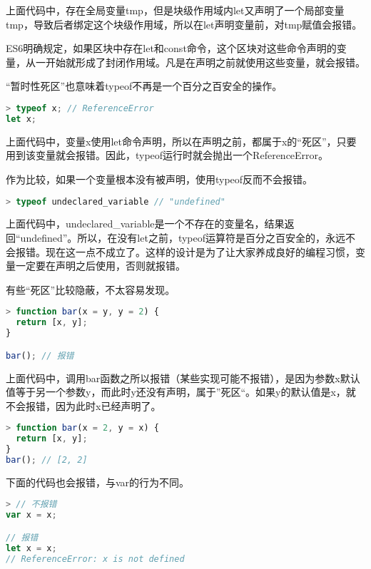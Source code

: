 上面代码中，存在全局变量tmp，但是块级作用域内let又声明了一个局部变量tmp，导致后者绑定这个块级作用域，所以在let声明变量前，对tmp赋值会报错。

ES6明确规定，如果区块中存在let和const命令，这个区块对这些命令声明的变量，从一开始就形成了封闭作用域。凡是在声明之前就使用这些变量，就会报错。

“暂时性死区”也意味着typeof不再是一个百分之百安全的操作。

\begin{lstlisting}[language=JavaScript]
> typeof x; // ReferenceError
let x;
\end{lstlisting}


上面代码中，变量x使用let命令声明，所以在声明之前，都属于x的“死区”，只要用到该变量就会报错。因此，typeof运行时就会抛出一个ReferenceError。

作为比较，如果一个变量根本没有被声明，使用typeof反而不会报错。

\begin{lstlisting}[language=JavaScript]
> typeof undeclared_variable // "undefined"
\end{lstlisting}

上面代码中，undeclared_variable是一个不存在的变量名，结果返回“undefined”。所以，在没有let之前，typeof运算符是百分之百安全的，永远不会报错。现在这一点不成立了。这样的设计是为了让大家养成良好的编程习惯，变量一定要在声明之后使用，否则就报错。

有些“死区”比较隐蔽，不太容易发现。

\begin{lstlisting}[language=JavaScript]
> function bar(x = y, y = 2) {
  return [x, y];
}

bar(); // 报错
\end{lstlisting}

上面代码中，调用bar函数之所以报错（某些实现可能不报错），是因为参数x默认值等于另一个参数y，而此时y还没有声明，属于”死区“。如果y的默认值是x，就不会报错，因为此时x已经声明了。

\begin{lstlisting}[language=JavaScript]
> function bar(x = 2, y = x) {
  return [x, y];
}
bar(); // [2, 2]
\end{lstlisting}


下面的代码也会报错，与var的行为不同。

\begin{lstlisting}[language=JavaScript]
> // 不报错
var x = x;

// 报错
let x = x;
// ReferenceError: x is not defined
\end{lstlisting}

